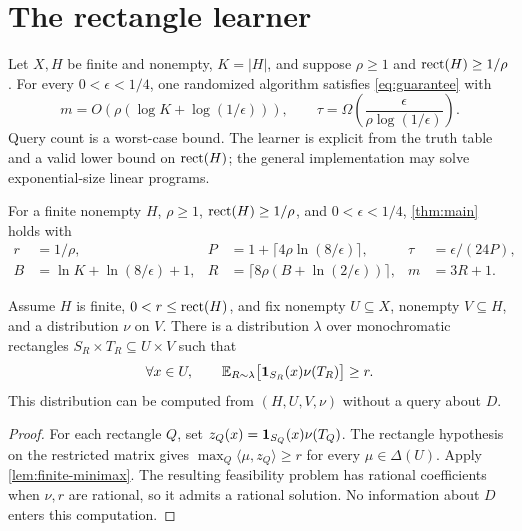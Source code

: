 \section{The rectangle learner}\label{sec:rectangle}

\begin{theorem}\label{thm:main}
Let $X,H$ be finite and nonempty, $K=|H|$, and suppose $\rho\ge1$ and $\operatorname{rect}(H)\ge1/\rho$. For every $0<\epsilon<1/4$, one randomized algorithm satisfies \eqref{eq:guarantee} with
\[
 m=O\!\left(\rho(\log K+\log(1/\epsilon))\right),\qquad
 \tau=\Omega\!\left(\frac{\epsilon}{\rho\log(1/\epsilon)}\right).
\]
Query count is a worst-case bound. The learner is explicit from the truth table and a valid lower bound on $\operatorname{rect}(H)$; the general implementation may solve exponential-size linear programs.
\end{theorem}


\begin{lemma}\label{lem:params}
For a finite nonempty $H$, $\rho\ge1$, $\operatorname{rect}(H)\ge1/\rho$, and $0<\epsilon<1/4$, \cref{thm:main} holds with
\begin{align}
 r&=1/\rho,&P&=1+\lceil4\rho\ln(8/\epsilon)\rceil,&\tau&=\epsilon/(24P),\label{eq:params1}\\
 B&=\ln K+\ln(8/\epsilon)+1,&R&=\lceil8\rho(B+\ln(2/\epsilon))\rceil,&m&=3R+1.\label{eq:params2}
\end{align}
\end{lemma}



\begin{lemma}\label{lem:mixture}
Assume $H$ is finite, $0<r\le\operatorname{rect}(H)$, and fix nonempty $U\subseteq X$, nonempty $V\subseteq H$, and a distribution $\nu$ on $V$. There is a distribution $\lambda$ over monochromatic rectangles $S_R\times T_R\subseteq U\times V$ such that
\begin{equation}\label{eq:coverage}
 \forall x\in U,\qquad
 \mathbb E_{R\sim\lambda}\bigl[\mathbf 1_{S_R}(x)\nu(T_R)\bigr]\ge r.
\end{equation}
This distribution can be computed from $(H,U,V,\nu)$ without a query about $D$.
\end{lemma}

\begin{proof}
For each rectangle $Q$, set $z_Q(x)=\mathbf 1_{S_Q}(x)\nu(T_Q)$. The rectangle hypothesis on the restricted matrix gives
$\max_Q\langle\mu,z_Q\rangle\ge r$ for every $\mu\in\Delta(U)$.
Apply \cref{lem:finite-minimax}. The resulting feasibility problem has rational coefficients when $\nu,r$ are rational, so it admits a rational solution. No information about $D$ enters this computation.
\end{proof}

